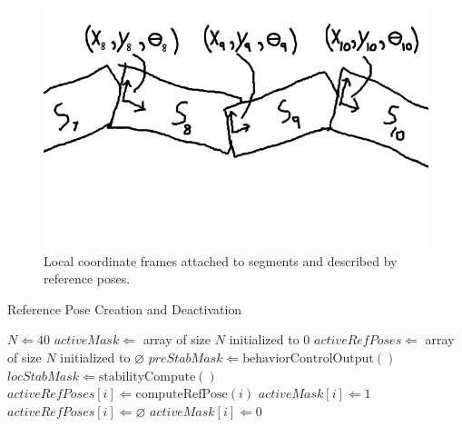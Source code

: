 \begin{figure}[htbp]
\centering
\includegraphics[keepaspectratio,width=400pt,height=0.75\textheight]{3_frames_2.png}
\caption{Local coordinate frames attached to segments and described by reference poses.}
\label{frames2}
\end{figure}




\begin{algorithm}
\caption{Reference Pose Creation and Deactivation}          %
\label{alg:reference}
\begin{algorithmic}

\State $N \Leftarrow 40$
\State $activeMask \Leftarrow $ array of size $N$ initialized to $0$
\State $activeRefPoses \Leftarrow $ array of size $N$ initialized to $\varnothing$
\State $preStabMask \Leftarrow \mathrm{behaviorControlOutput}()$
\State $locStabMask \Leftarrow \mathrm{stabilityCompute()}$
\State      $activeRefPoses[i] \Leftarrow \mathrm{computeRefPose}(i)$
\State      $activeMask[i] \Leftarrow 1$
\EndIf
{}
\State    $activeRefPoses[i] \Leftarrow \varnothing$
\State    $activeMask[i] \Leftarrow 0$
\EndIf
\EndFor

\end{algorithmic}
\end{algorithm}



